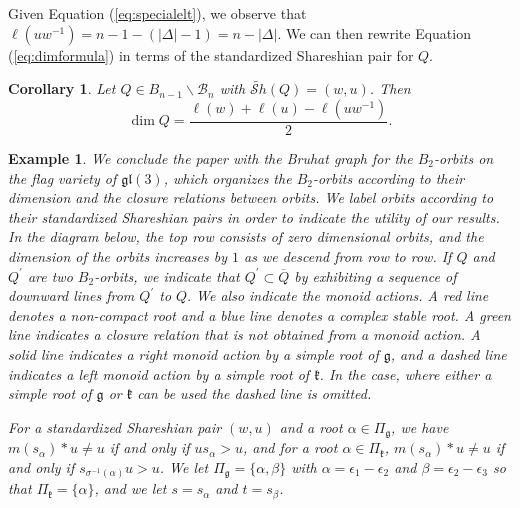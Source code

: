 \documentclass[12pt]{amsart}
\numberwithin{equation}{section}
\newtheorem{cor}[thm]{Corollary}
\newtheorem{exam}[thm]{Example}
\newcommand{\fk}{\mbox{${\mathfrak k}$}}
\newcommand{\fg}{\mbox{${\mathfrak g}$}}
\newcommand{\eps}{\epsilon}
\newcommand{\fgl}{\mathfrak{gl}}
\newcommand{\B}{\mathcal{B}}
\newcommand{\ms}{m(s_{\alpha})}
\newcommand{\Borbitspace}{B_{n-1}\backslash\B_{n}}
\newcommand{\Sh}{\mathcal{S}h}
\begin{document}
Given Equation (\ref{eq:specialelt}), we observe that $\ell(uw^{-1})=n-1-(|\Delta|-1)=n-|\Delta|$.  We can then rewrite Equation (\ref{eq:dimformula}) in 
terms of the standardized Shareshian pair for $Q$.  
\begin{cor}\label{c:twisteddim}
Let $Q\in\Borbitspace$ with $\widetilde{\Sh}(Q)=(w,u)$.  Then 
\begin{equation} \label{eq:normdimformula}
\dim Q=\frac{\ell(w)+\ell(u)-\ell(uw^{-1})}{2}.
\end{equation}
\end{cor}

 

\begin{exam}\label{ex:b2flag3}
We conclude the paper with the Bruhat graph for the $B_{2}$-orbits on the flag variety of $\fgl(3)$, which organizes the $B_2$-orbits according to their dimension and the closure relations between orbits.  We label orbits according to their standardized Shareshian pairs in order to indicate the utility of our results.    In the diagram below, the top row consists of zero dimensional orbits, and the dimension of the orbits increases by $1$ as we descend from row to row.   If $Q$ and $Q^{\prime}$ are two $B_{2}$-orbits, we indicate that $Q^{\prime} \subset \overline{Q}$ by exhibiting a sequence of downward lines from $Q^{\prime}$ to $Q.$     We also indicate the monoid actions.  A red line denotes a non-compact root and a blue line denotes a complex stable root.  A green line
indicates a closure relation that is not obtained from a monoid action.  A solid line indicates a right monoid action by a simple root of $\fg$, and a dashed line indicates a left monoid action by a simple root of $\fk$.  In the case, where either a simple root of $\fg$ or $\fk$ can be used the dashed line is omitted. 

For a standardized Shareshian pair $(w,u)$ and a root $\alpha\in\Pi_{\fg}$, we have 
$\ms*u \neq u$ if and only if $us_{\alpha}>u$, and for a root $\alpha\in \Pi_{\fk}$, $\ms*u\neq u$ if and only 
if $ s_{\sigma^{-1}(\alpha)}u> u$.   We let 
$\Pi_{\fg}=\{ \alpha, \beta\}$ with $\alpha=\eps_{1}-\eps_{2}$ and $\beta=\eps_{2}-\eps_{3}$ so that $\Pi_{\fk}=\{\alpha\}$, and we let $s=s_{\alpha}$ and $t=s_{\beta}$. 

\end{exam}
\end{document}
